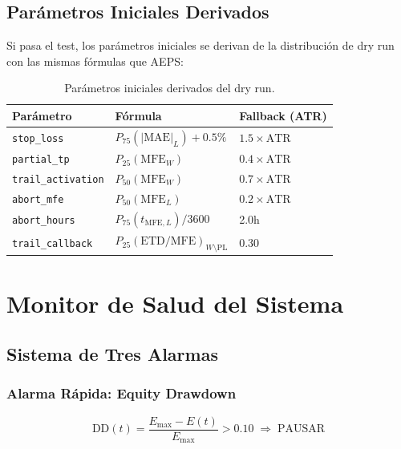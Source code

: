 \documentclass[11pt,a4paper]{article}
\newcommand{\param}[1]{\texttt{\small\color{cpurple}#1}}
\begin{document}
\subsection{Par\'ametros Iniciales Derivados}

Si pasa el test, los par\'ametros iniciales se derivan de la
distribuci\'on de dry run con las mismas f\'ormulas que AEPS:

\begin{table}[H]
\centering
\caption{Par\'ametros iniciales derivados del dry run.}
\begin{tabularx}{\textwidth}{lXl}
\toprule
\textbf{Par\'ametro} & \textbf{F\'ormula} & \textbf{Fallback (ATR)} \\
\midrule
\param{stop\_loss} & $P_{75}(|\text{MAE}|_L) + 0.5\%$ & $1.5 \times \text{ATR}$ \\
\param{partial\_tp} & $P_{25}(\text{MFE}_W)$ & $0.4 \times \text{ATR}$ \\
\param{trail\_activation} & $P_{50}(\text{MFE}_W)$ & $0.7 \times \text{ATR}$ \\
\param{abort\_mfe} & $P_{50}(\text{MFE}_L)$ & $0.2 \times \text{ATR}$ \\
\param{abort\_hours} & $P_{75}(t_{\text{MFE},L}) / 3600$ & 2.0h \\
\param{trail\_callback} & $P_{25}(\text{ETD}/\text{MFE})_{W \setminus \text{PL}}$ & 0.30 \\
\bottomrule
\end{tabularx}
\end{table}


\section{Monitor de Salud del Sistema}
\label{sec:health}

\subsection{Sistema de Tres Alarmas}

\subsubsection{Alarma R\'apida: Equity Drawdown}

\begin{equation}
\text{DD}(t) = \frac{E_{\max} - E(t)}{E_{\max}} > 0.10
\;\Rightarrow\; \text{PAUSAR}
\end{equation}
\end{document}
